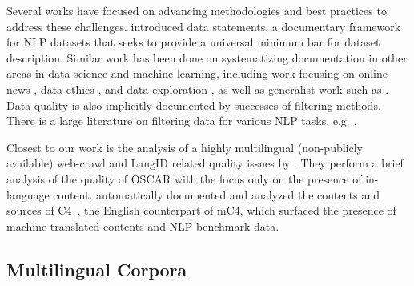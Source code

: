 Several works have focused on advancing methodologies and best practices to address these challenges. \citet{bender-friedman-2018-data} introduced data statements, a documentary framework for NLP datasets that seeks to provide a universal minimum bar for dataset description. Similar work has been done on systematizing documentation in other areas in data science and machine learning, including work focusing on online news \citep{kevin-etal-2018-information}, data ethics \citep{sun-etal-2019-mithralabel}, and data exploration \citep{holland-etal-2018-the}, as well as generalist work such as \citep{gebru-etal-2018-datasheets}. Data quality is also implicitly documented by successes of filtering methods. There is a large literature on filtering data for various NLP tasks, e.g. \citet{axelrod-etal-2011-domain,moore-lewis-2010-intelligent,rarrick-etal-2011-mt,wang-etal-2018-denoising,kamholz-etal-2014-panlex,junczys-dowmunt-2018-dual,caswell-etal-2020-language}.

Closest to our work is the analysis of a highly multilingual (non-publicly available) web-crawl and LangID related quality issues by \citet{caswell-etal-2020-language}. They perform a brief analysis of the quality of OSCAR with the focus only on the presence of in-language content. \citet{dodge-etal-2021-documenting} automatically documented and analyzed the contents and sources of C4~\citep{raffel-etal-2020-exploring}, the English counterpart of mC4, which surfaced the presence of machine-translated contents and NLP benchmark data.

\subsection{Multilingual Corpora}\label{sec:crawls}


